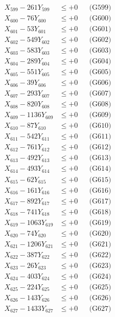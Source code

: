 \documentclass[a4paper,10pt]{article}
\begin{document}
{\begin{align}
X_{599} - 261Y_{599} &\leq +0 && \text{(G599)} \\
X_{600} - 76Y_{600} &\leq +0 && \text{(G600)} \\
\allowbreak
X_{601} - 53Y_{601} &\leq +0 && \text{(G601)} \\
X_{602} - 549Y_{602} &\leq +0 && \text{(G602)} \\
X_{603} - 583Y_{603} &\leq +0 && \text{(G603)} \\
X_{604} - 289Y_{604} &\leq +0 && \text{(G604)} \\
X_{605} - 551Y_{605} &\leq +0 && \text{(G605)} \\
X_{606} - 39Y_{606} &\leq +0 && \text{(G606)} \\
X_{607} - 293Y_{607} &\leq +0 && \text{(G607)} \\
X_{608} - 820Y_{608} &\leq +0 && \text{(G608)} \\
X_{609} - 1136Y_{609} &\leq +0 && \text{(G609)} \\
X_{610} - 87Y_{610} &\leq +0 && \text{(G610)} \\
\allowbreak
X_{611} - 542Y_{611} &\leq +0 && \text{(G611)} \\
X_{612} - 761Y_{612} &\leq +0 && \text{(G612)} \\
X_{613} - 492Y_{613} &\leq +0 && \text{(G613)} \\
X_{614} - 493Y_{614} &\leq +0 && \text{(G614)} \\
X_{615} - 62Y_{615} &\leq +0 && \text{(G615)} \\
X_{616} - 161Y_{616} &\leq +0 && \text{(G616)} \\
X_{617} - 892Y_{617} &\leq +0 && \text{(G617)} \\
X_{618} - 741Y_{618} &\leq +0 && \text{(G618)} \\
X_{619} - 1063Y_{619} &\leq +0 && \text{(G619)} \\
X_{620} - 74Y_{620} &\leq +0 && \text{(G620)} \\
\allowbreak
X_{621} - 1206Y_{621} &\leq +0 && \text{(G621)} \\
X_{622} - 387Y_{622} &\leq +0 && \text{(G622)} \\
X_{623} - 26Y_{623} &\leq +0 && \text{(G623)} \\
X_{624} - 403Y_{624} &\leq +0 && \text{(G624)} \\
X_{625} - 224Y_{625} &\leq +0 && \text{(G625)} \\
X_{626} - 143Y_{626} &\leq +0 && \text{(G626)} \\
X_{627} - 1433Y_{627} &\leq +0 && \text{(G627)} \\

\end{align}}
\end{document}
